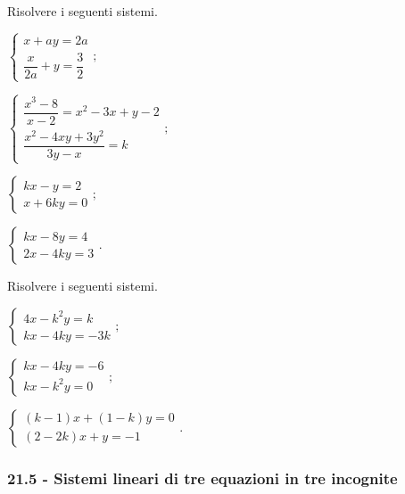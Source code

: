 \begin{esercizio}[\Ast]
 \label{ese:21.57}
Risolvere i seguenti sistemi.
\begin{multicols}{2}
 \begin{enumeratea}
 {\longarray
\item $\left\{\begin{array}{l}x+ay=2a\\\dfrac{x}{2a}+y=\dfrac{3}{2}\end{array}\right.;$
\item $\left\{\begin{array}{l}\dfrac{x^{3}-8}{x-2}=x^{2}-3x+y-2\\\dfrac{x^{2}-4xy+3y^{2}}{3y-x}=k\end{array}\right.;$
\item $\left\{\begin{array}{l}kx-y=2\\x+6ky=0\end{array}\right.;$
\item $\left\{\begin{array}{l}kx-8y=4\\2x-4ky=3\end{array}\right..$}
 \end{enumeratea}
\end{multicols}
\end{esercizio}

\begin{esercizio}[\Ast]
 \label{ese:21.58}
Risolvere i seguenti sistemi.
\begin{multicols}{2}
 \begin{enumeratea}
\item $\left\{\begin{array}{l}4x-k^{2}y=k\\kx-4ky=-3k\end{array}\right.;$
\item $\left\{\begin{array}{l}kx-4ky=-6\\kx-k^{2}y=0\end{array}\right.;$
\item $\left\{\begin{array}{l}(k-1)x+(1-k)y=0\\(2-2k)x+y=-1\end{array}\right..$
 \end{enumeratea}
\end{multicols}
\end{esercizio}

 \subsubsection*{21.5 - Sistemi lineari di tre equazioni in tre incognite}

